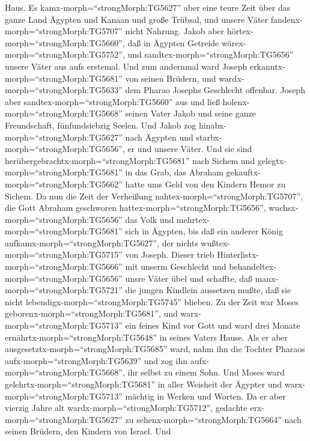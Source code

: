 Haus.  Es kamx-morph=``strongMorph:TG5627'' aber eine teure
Zeit über das ganze Land Ägypten und Kanaan und große Trübsal, und
unsere Väter fandenx-morph=``strongMorph:TG5707'' nicht Nahrung.
 Jakob aber hörtex-morph=``strongMorph:TG5660'', daß in
Ägypten Getreide wärex-morph=``strongMorph:TG5752'', und
sandtex-morph=``strongMorph:TG5656'' unsere Väter aus aufs erstemal.
 Und zum andernmal ward Joseph
erkanntx-morph=``strongMorph:TG5681'' von seinen Brüdern, und
wardx-morph=``strongMorph:TG5633'' dem Pharao Josephs Geschlecht
offenbar.  Joseph aber sandtex-morph=``strongMorph:TG5660''
aus und ließ holenx-morph=``strongMorph:TG5668'' seinen Vater Jakob und
seine ganze Freundschaft, fünfundsiebzig Seelen.  Und Jakob
zog hinabx-morph=``strongMorph:TG5627'' nach Ägypten und
starbx-morph=``strongMorph:TG5656'', er und unsere Väter. 
Und sie sind herübergebrachtx-morph=``strongMorph:TG5681'' nach Sichem
und gelegtx-morph=``strongMorph:TG5681'' in das Grab, das Abraham
gekauftx-morph=``strongMorph:TG5662'' hatte ums Geld von den Kindern
Hemor zu Sichem.  Da nun die Zeit der Verheißung
nahtex-morph=``strongMorph:TG5707'', die Gott Abraham geschworen
hattex-morph=``strongMorph:TG5656'', wuchsx-morph=``strongMorph:TG5656''
das Volk und mehrtex-morph=``strongMorph:TG5681'' sich in Ägypten,
 bis daß ein anderer König
aufkamx-morph=``strongMorph:TG5627'', der nichts
wußtex-morph=``strongMorph:TG5715'' von Joseph.  Dieser
trieb Hinterlistx-morph=``strongMorph:TG5666'' mit unserm Geschlecht und
behandeltex-morph=``strongMorph:TG5656'' unsre Väter übel und schaffte,
daß manx-morph=``strongMorph:TG5721'' die jungen Kindlein aussetzen
mußte, daß sie nicht lebendigx-morph=``strongMorph:TG5745'' blieben.
 Zu der Zeit war Moses
geborenx-morph=``strongMorph:TG5681'', und
warx-morph=``strongMorph:TG5713'' ein feines Kind vor Gott und ward drei
Monate ernährtx-morph=``strongMorph:TG5648'' in seines Vaters Hause.
 Als er aber ausgesetztx-morph=``strongMorph:TG5685'' ward,
nahm ihn die Tochter Pharaos aufx-morph=``strongMorph:TG5639'' und zog
ihn aufx-morph=``strongMorph:TG5668'', ihr selbst zu einem Sohn.
 Und Moses ward gelehrtx-morph=``strongMorph:TG5681'' in
aller Weisheit der Ägypter und warx-morph=``strongMorph:TG5713'' mächtig
in Werken und Worten.  Da er aber vierzig Jahre alt
wardx-morph=``strongMorph:TG5712'', gedachte
erx-morph=``strongMorph:TG5627'' zu sehenx-morph=``strongMorph:TG5664''
nach seinen Brüdern, den Kindern von Israel.  Und
